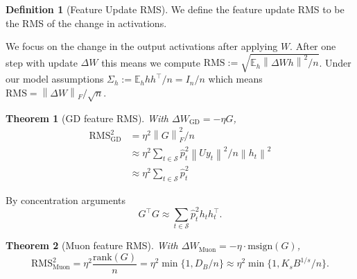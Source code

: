 \documentclass[11pt]{article}
\newtheorem{theorem}{Theorem}
\theoremstyle{definition}
\newtheorem{definition}{Definition}
\newcommand{\E}{\mathbb{E}}
\newcommand{\msgn}{\mathrm{msign}}
\newcommand{\norm}[1]{\left\lVert#1\right\rVert}
\newcommand{\cS}{\mathcal{S}}
\newcommand{\RMS}{\mathrm{RMS}}
\newcommand{\Muon}{\mathrm{Muon}}
\newcommand{\rank}{\mathrm{rank}}
\begin{document}
\begin{definition}[Feature Update RMS]
We define the feature update RMS to be the RMS of the change in activations.
\end{definition}
We focus on the change in the output activations after applying $W$. After one step with update $\Delta W$ this means we compute $\RMS := \sqrt{\E_h \norm{\Delta W h}^2 / n}$. Under our model assumptions $\Sigma_h := \E_h hh^\top / n = I_n / n$ which means $\RMS = \norm{\Delta W}_F / \sqrt{n}$.
\begin{theorem}[GD feature RMS]\label{thm:GD-decoupled}
With $\Delta W_{\mathrm{GD}}=-\eta G$,
\begin{align*}
    \mathrm{RMS}_{\mathrm{GD}}^2 &= \eta^2 \norm{G}^2_F / n\\
    &\approx \eta^2 \sum\limits_{t \in \cS} \hat{p}_t^2 \norm{U y_t}^2 / n \norm{h_t}^2 \\
    &\approx \eta^2 \sum\limits_{t \in \cS} \hat{p}_t^2
\end{align*}
\end{theorem}
By concentration arguments
\[
    G^\top G \approx \sum\limits_{t \in \cS} \hat{p}^2_t h_t h_t^\top.
\]

\begin{theorem}[Muon feature RMS]
    With $\Delta W_{\Muon} = -\eta \cdot \msgn(G)$, 
    \[
        \RMS^2_{\Muon} = \eta^2 \frac{\rank(G)}{n} = \eta^2 \min\{1, D_B / n\} \approx \eta^2 \min\{1, K_s B^{1/s} / n\}.
    \]
\end{theorem}
\end{document}
